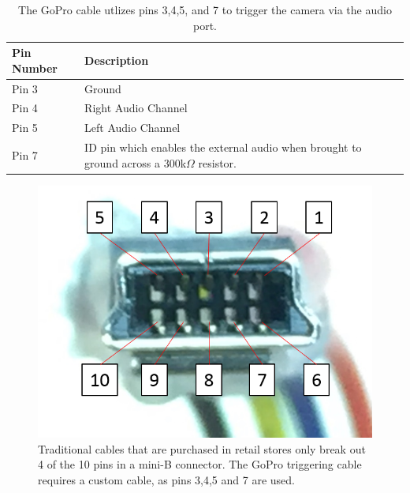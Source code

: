 \begin{table}[h]
	\centering
	\begin{tabular}{l|l}
		\toprule
		Pin Number & Description \\
		\midrule
		Pin 3 & Ground\\
		Pin 4 & Right Audio Channel\\
		Pin 5 & Left Audio Channel\\
		Pin 7 & ID pin which enables the external audio when brought to ground across a 300k$\Omega$ resistor.\\
		\bottomrule
	\end{tabular}
	\caption{The GoPro cable utlizes pins 3,4,5, and 7 to trigger the camera via the audio port.}
	\label{tab:pinouts}
\end{table}

\begin{figure}[H]
	\centering
	\includegraphics[scale = 0.7]{../figures/tenpin.png}
	\caption{Traditional cables that are purchased in retail stores only break out 4 of the 10 pins in a mini-B connector.  The GoPro triggering cable requires a custom cable, as pins 3,4,5 and 7 are used.}
	\label{fig:pinouts}
\end{figure}

